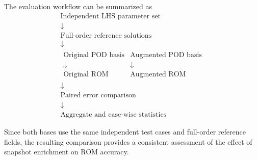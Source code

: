 The evaluation workflow can be summarized as
\[
\boxed{
\begin{gathered}
\text{Independent LHS parameter set}\\
\downarrow\\
\text{Full-order reference solutions}\\
\downarrow\\
\begin{array}{cc}
\text{Original POD basis} &
\text{Augmented POD basis}\\
\downarrow & \downarrow\\
\text{Original ROM} & \text{Augmented ROM}
\end{array}\\
\downarrow\\
\text{Paired error comparison}\\
\downarrow\\
\text{Aggregate and case-wise statistics}
\end{gathered}
}
\]

Since both bases use the same independent test cases and
full-order reference fields, the resulting comparison
provides a consistent assessment of the effect of
snapshot enrichment on ROM accuracy.
